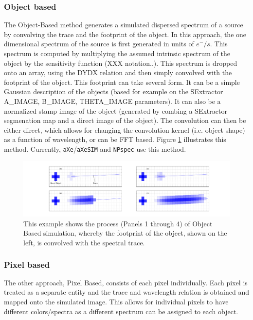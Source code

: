 \documentclass[preprint]{aastex}
\begin{document}
\subsubsection{Object based}

The Object-Based method generates a simulated dispersed spectrum of a source by convolving the trace and the footprint of the object. In this approach, the one dimensional spectrum of the source is first generated in units of $e^-/s$. This spectrum is computed by multiplying the assumed intrinsic spectrum of the object by the sensitivity function (XXX notation..). This spectrum is dropped onto an array, using the DYDX relation and then simply convolved with the footprint of the object. This footprint can take several form. It can be a simple Gaussian description of the objects (based for example on the SExtractor A\_IMAGE, B\_IMAGE, THETA\_IMAGE parameters). It can also be a normalized stamp image of the object (generated by combing a SExtractor segmenation map and a direct image of the object). The convolution can then be either direct, which allows for changing the convolution kernel (i.e. object shape) as a function of wavelength, or can be FFT based.
Figure \ref{sim:1} illustrates this method. Currently, \texttt{aXe}/\texttt{aXeSIM} and \texttt{NPspec} use this method. 


\begin{figure}[!t]
\centering
\includegraphics[width=7.5in]{"Figures/object_sim"}
\caption{This example shows the process (Panels 1 through 4) of Object Based simulation, whereby the footprint of the object, shown on the left, is convolved with the spectral trace.}
\label{sim:1}
\end{figure}

\subsubsection{Pixel based}

The other approach, Pixel Based, consists of each pixel individually. Each pixel is treated as a separate entity and the trace and wavelength relation is obtained and mapped onto the simulated image. This allows for individual pixels to have different colors/spectra as a different spectrum can be assigned to each object. 
\end{document}

